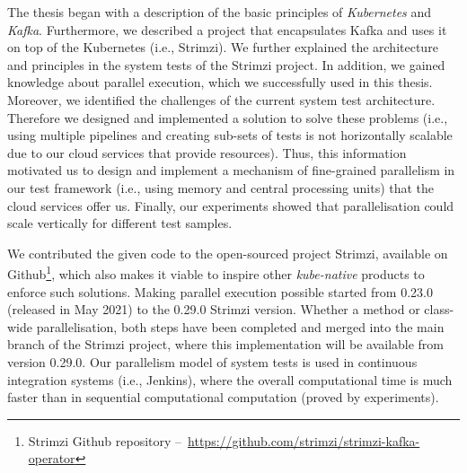 The thesis began with a description of the basic principles of \emph{Kubernetes} and \emph{Kafka}.
Furthermore, we described a project that encapsulates Kafka and uses it on top of the Kubernetes (i.e., Strimzi).
We further explained the architecture and principles in the system tests of the Strimzi project.
In addition, we gained knowledge about parallel execution, which we successfully used in this thesis.
Moreover, we identified the challenges of the current system test architecture.
Therefore we designed and implemented a solution to solve these problems (i.e., using multiple pipelines and creating sub-sets of
tests is not horizontally scalable due to our cloud services that provide resources).
Thus, this information motivated us to design and implement a mechanism of fine-grained parallelism in our test framework (i.e., using memory and central processing units) that the cloud services offer us.
Finally, our experiments showed that parallelisation could scale vertically for different test samples.

We contributed the given code to the open-sourced project Strimzi, available on
Github\footnote{Strimzi Github repository \---\ \url{https://github.com/strimzi/strimzi-kafka-operator}},
which also makes it viable to inspire other \emph{kube-native} products to enforce such solutions.
Making parallel execution possible started from 0.23.0 (released in May 2021) to the 0.29.0 Strimzi version.
Whether a method or class-wide parallelisation, both steps have been completed and merged into the main branch of
the Strimzi project, where this implementation will be available from version 0.29.0.
Our parallelism model of system tests is used in continuous integration systems (i.e., Jenkins),
where the overall computational time is much faster than in sequential computational computation (proved by experiments).

